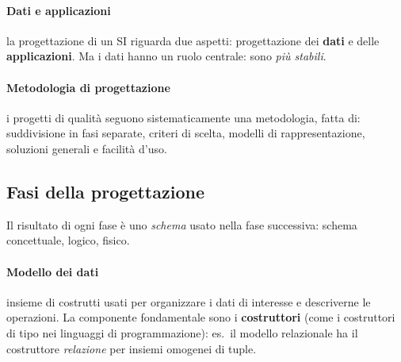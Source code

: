 \documentclass[a4paper,12pt]{article}
\begin{document}
\paragraph{Dati e applicazioni} la progettazione di un SI riguarda due aspetti:
progettazione dei \textbf{dati} e delle \textbf{applicazioni}. Ma i dati hanno
un ruolo centrale: sono \emph{più stabili}.

\paragraph{Metodologia di progettazione} i progetti di qualità seguono
sistematicamente una metodologia, fatta di: suddivisione in fasi separate,
criteri di scelta, modelli di rappresentazione, soluzioni generali e facilità
d'uso.

\subsection{Fasi della progettazione}

\begin{center}
\end{center}
Il risultato di ogni fase è uno \emph{schema} usato nella fase successiva:
schema concettuale, logico, fisico.

\paragraph{Modello dei dati} insieme di costrutti usati per organizzare i dati
di interesse e descriverne le operazioni. La componente fondamentale sono i
\textbf{costruttori} (come i costruttori di tipo nei linguaggi di
programmazione): es.\ il modello relazionale ha il costruttore
\emph{relazione} per insiemi omogenei di tuple.
\end{document}
